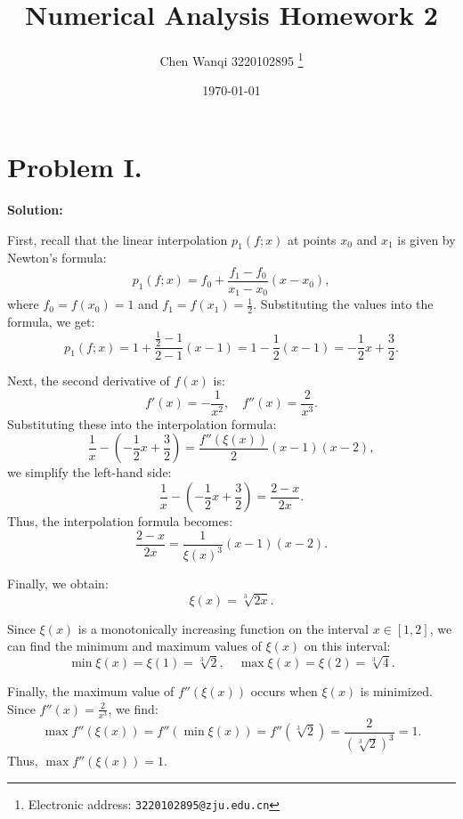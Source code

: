 \documentclass[a4paper, 12pt]{article}
\begin{document}
\title{Numerical Analysis Homework 2}

\author{Chen Wanqi 3220102895
  \thanks{Electronic address: \texttt{3220102895@zju.edu.cn}}}


\date{\today}

\maketitle

\section*{Problem I.}

\textbf{Solution:}

First, recall that the linear interpolation \( p_1(f; x) \) at points \( x_0 \) and \( x_1 \) is given by Newton's formula:
\[
p_1(f; x) = f_0 + \frac{f_1 - f_0}{x_1 - x_0}(x - x_0),
\]
where \( f_0 = f(x_0) = 1 \) and \( f_1 = f(x_1) = \frac{1}{2} \). Substituting the values into the formula, we get:
\[
p_1(f; x) = 1 + \frac{\frac{1}{2} - 1}{2 - 1}(x - 1) = 1 - \frac{1}{2}(x - 1) = -\frac{1}{2}x + \frac{3}{2}.
\]

Next, the second derivative of \( f(x) \) is:
\[
f'(x) = -\frac{1}{x^2}, \quad f''(x) = \frac{2}{x^3}.
\]
Substituting these into the interpolation formula:
\[
\frac{1}{x} - \left( -\frac{1}{2}x + \frac{3}{2} \right) = \frac{f''(\xi(x))}{2} (x - 1)(x - 2),
\]
we simplify the left-hand side:
\[
\frac{1}{x} - \left( -\frac{1}{2}x + \frac{3}{2} \right) = \frac{2 - x}{2x}.
\]
Thus, the interpolation formula becomes:
\[
\frac{2 - x}{2x} = \frac{1}{\xi(x)^3} (x - 1)(x - 2).
\]

Finally, we obtain:
\[
\boxed{\xi(x) = \sqrt[3]{2x}.}
\]

Since \( \xi(x) \) is a monotonically increasing function on the interval \( x \in [1, 2] \), we can find the minimum and maximum values of \( \xi(x) \) on this interval:
\[
\boxed{\min \xi(x) = \xi(1) = \sqrt[3]{2}}, \quad \boxed{\max \xi(x) = \xi(2) = \sqrt[3]{4}.}
\]

Finally, the maximum value of \( f''(\xi(x)) \) occurs when \( \xi(x) \) is minimized. Since \( f''(x) = \frac{2}{x^3} \), we find:
\[
\max f''(\xi(x)) = f''(\min \xi(x)) = f''\left( \sqrt[3]{2} \right) = \frac{2}{\left( \sqrt[3]{2} \right)^3} = 1.
\]
Thus, \(\boxed{ \max f''(\xi(x)) = 1 }\).
\end{document}
